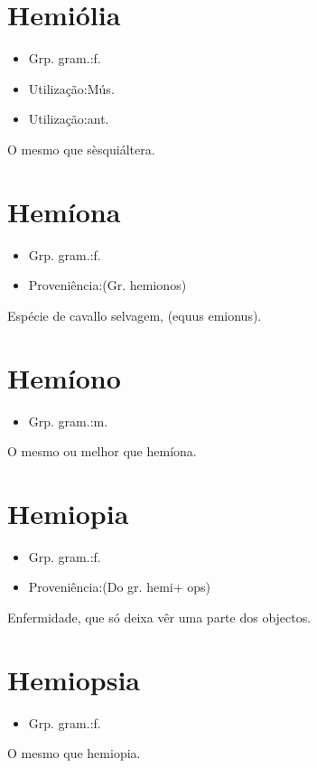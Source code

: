 \documentclass{article}
\begin{document}
\section{Hemiólia}
\begin{itemize}
\item {Grp. gram.:f.}
\end{itemize}
\begin{itemize}
\item {Utilização:Mús.}
\end{itemize}
\begin{itemize}
\item {Utilização:ant.}
\end{itemize}
O mesmo que \textunderscore sèsquiáltera\textunderscore .
\section{Hemíona}
\begin{itemize}
\item {Grp. gram.:f.}
\end{itemize}
\begin{itemize}
\item {Proveniência:(Gr. \textunderscore hemionos\textunderscore )}
\end{itemize}
Espécie de cavallo selvagem, (\textunderscore equus emionus\textunderscore ).
\section{Hemíono}
\begin{itemize}
\item {Grp. gram.:m.}
\end{itemize}
O mesmo ou melhor que \textunderscore hemíona\textunderscore .
\section{Hemiopia}
\begin{itemize}
\item {Grp. gram.:f.}
\end{itemize}
\begin{itemize}
\item {Proveniência:(Do gr. \textunderscore hemi\textunderscore  + \textunderscore ops\textunderscore )}
\end{itemize}
Enfermidade, que só deixa vêr uma parte dos objectos.
\section{Hemiopsia}
\begin{itemize}
\item {Grp. gram.:f.}
\end{itemize}
O mesmo que \textunderscore hemiopia\textunderscore .
\end{document}
